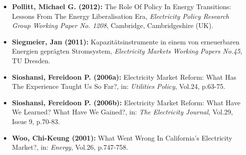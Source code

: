 \documentclass[11pt,a4paper,english]{scrreprt}
\begin{document}
\begin{itemize}
	
	
	\item [\Rectsteel] \textbf{Pollitt, Michael G. (2012):} The Role Of
Policy In Energy Transitions: Lessons From The Energy Liberalisation Era,
\textsl{Electricity Policy Research Group Working Paper No. 1208}, Cambridge,
Cambridgeshire (UK).


	\item[\Rectsteel] \textbf{Siegmeier, Jan (2011):}
Kapazit\"{a}tsinstrumente in einem von erneuerbaren Energien gepr\"{a}gten
Stromsystem, \textsl{Electricity Markets Working Papers No.45}, TU Dresden.
	
	
	\item [\Rectsteel] \textbf{Sioshansi, Fereidoon P. (2006a):} Electricity
Market Reform: What Has The Experience Taught Us So Far?, in:
\textsl{Utilities Policy}, Vol.24, p.63-75.
		
	
	\item [\Rectsteel] \textbf{Sioshansi, Fereidoon P. (2006b):} Electricity
Market Reform: What Have We Learned? What Have We Gained?, in: \textsl{The
Electricity Journal}, Vol.29, Issue 9, p.70-83.
	
	
	\item [\Rectsteel] \textbf{Woo, Chi-Keung (2001):} What Went Wrong In
California's Electricity Market?, in: \textsl{Energy}, Vol.26, p.747-758.	
	



  \end{itemize}
\end{document}
